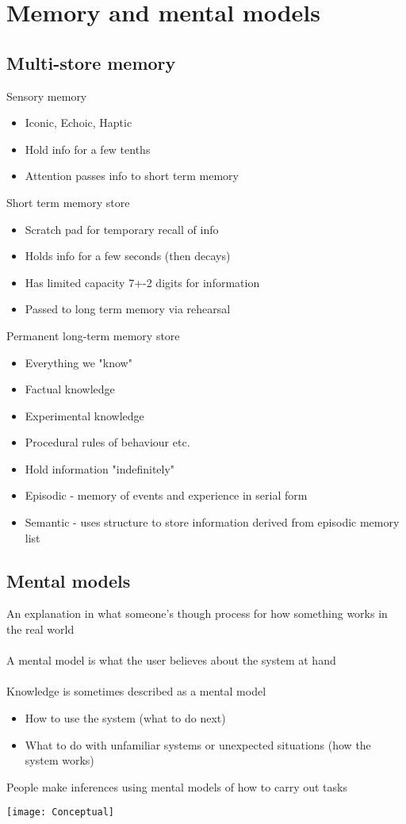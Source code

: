 \documentclass{article}[18pt]
\begin{document}
\section{Memory and mental models}
\subsection{Multi-store memory}
Sensory memory
\begin{itemize}
	\item Iconic, Echoic, Haptic
	\item Hold info for a few tenths
	\item Attention passes info to short term memory
\end{itemize}
Short term memory store
\begin{itemize}
	\item Scratch pad for temporary recall of info
	\item Holds info for a few seconds (then decays)
	\item Has limited capacity 7+-2 digits for information
	\item Passed to long term memory via rehearsal 
\end{itemize}
Permanent long-term memory store
\begin{itemize}
	\item Everything we "know"
	\item Factual knowledge
	\item Experimental knowledge
	\item Procedural rules of behaviour etc.
	\item Hold information "indefinitely"
	\item Episodic - memory of events and experience in serial form
	\item Semantic - uses structure to store information derived from episodic memory list
\end{itemize}
\subsection{Mental models}
An explanation in what someone's though process for how something works in the real world\\
\\
A mental model is what the user believes about the system at hand\\
\\
Knowledge is sometimes described as a mental model
\begin{itemize}
	\item How to use the system (what to do next)
	\item What to do with unfamiliar systems or unexpected situations (how the system works)
\end{itemize}
People make inferences using mental models of how to carry out tasks
\begin{center}
	\texttt{[image: Conceptual]}
\end{center}
\end{document}
